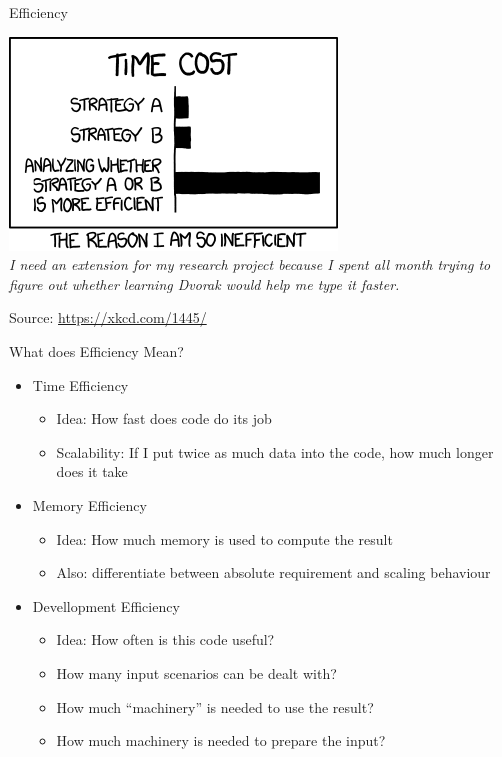 
\begin{frame}[t,plain]
\titlepage
\end{frame}


\begin{frame}{Efficiency}
%
\begin{center}
	\includegraphics[width=.4\linewidth]{./gfx/efficiency}\\
	\emph{I need an extension for my research project because I spent all month trying to figure out whether learning Dvorak would help me type it faster.}

	\vspace{6pt}
	Source: \url{https://xkcd.com/1445/}
\end{center}
%
\end{frame}


\begin{frame}{What does Efficiency Mean?}
%
\begin{itemize}
\item Time Efficiency
	\begin{itemize}
	\item Idea: How fast does code do its job
	\item Scalability: If I put twice as much data into the code, how much longer does it take
	\end{itemize}
\item Memory Efficiency
	\begin{itemize}
	\item Idea: How much memory is used to compute the result
	\item Also: differentiate between absolute requirement and scaling behaviour
	\end{itemize}
\item Devellopment Efficiency
	\begin{itemize}
	\item Idea: How often is this code useful?
	\item How many input scenarios can be dealt with?
	\item How much \enquote{machinery} is needed to use the result?
	\item How much machinery is needed to prepare the input?
	\end{itemize}
\end{itemize}
%
\end{frame}

